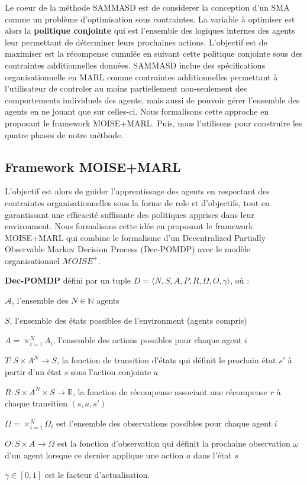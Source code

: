 \documentclass[sigconf,anonymous]{aamas}
\begin{document}
Le coeur de la méthode SAMMASD est de considerer la conception d'un SMA comme un problème d'optimisation sous contraintes. La variable à optimiser est alors la \textbf{politique conjointe} qui est l'ensemble des logiques internes des agents leur permettant de déterminer leurs prochaines actions. L'objectif est de maximiser est la récompense cumulée en suivant cette politique conjointe sous des contraintes additionnelles données. SAMMASD inclue des spécifications organisationnelle en MARL comme contraintes additionnelles permettant à l'utilisateur de controler au moins partiellement non-seulement des comportements individuels des agents, mais aussi de pouvoir gérer l'ensemble des agents en ne jouant que sur celles-ci. Nous formalisons cette approche en proposant le framework MOISE+MARL. Puis, nous l'utilisons pour construire les quatre phases de notre méthode.

\subsection{\textbf{Framework MOISE+MARL}}

L'objectif est alors de guider l'apprentissage des agents en respectant des contraintes organisationnelles sous la forme de role et d'objectifs, tout en garantissant une efficacité suffisante des politiques apprises dans leur environment.
Nous formalisons cette idée en proposant le framework MOISE+MARL qui combine le formalisme d'un Decentralized Partially Observable Markov Decision Process (Dec-POMDP) avec le modèle organisationnel $\mathcal{M}OISE^+$.

\textbf{Dec-POMDP} \quad défini par un tuple $D = \langle N, S, A, P, R, \Omega, O, \gamma \rangle$, où :
%
\begin{itemize*}[label={},itemjoin={; }]
    \item $\mathcal{A}$, l'ensemble des $N \in \mathbb{N}$ agents
    \item $S$, l'ensemble des états possibles de l'environment (agents compris)
    \item $A = \times_{i=1}^N A_i $, l'ensemble des actions possibles pour chaque agent $i$
    \item $T: S \times A^N \to S$, la fonction de transition d'états qui définit le prochain état $s'$ à partir d'un état $s$ sous l'action conjointe $a$
    \item $R: S \times A^N \times  S \to \mathbb{R}$, la fonction de récompense associant une récompense $r$ à chaque transition $(s, a, s')$
    \item $\Omega = \times_{i=1}^N \Omega_i $ est l'ensemble des observations possibles pour chaque agent $i$
    \item $O: S \times A \to \Omega$ est la fonction d'observation qui définit la prochaine observation $\omega$ d'un agent lorsque ce dernier applique une action $a$ dans l'état $s$
    \item $\gamma \in [0, 1] $ est le facteur d'actualisation.
\end{itemize*}
\end{document}
